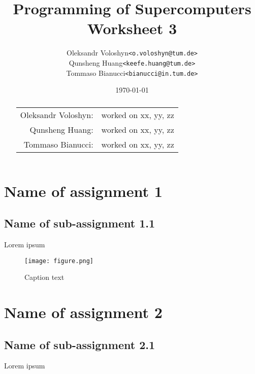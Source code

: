 \documentclass{article}
\title{Programming of Supercomputers\\Worksheet 3}
\author{
	\begin{tabular}{rl}
		Oleksandr Voloshyn& \texttt{<o.voloshyn@tum.de>}\\ 
		Qunsheng Huang& \texttt{<keefe.huang@tum.de>}\\ 
		Tommaso Bianucci& \texttt{<bianucci@in.tum.de>}
	\end{tabular}
}
\date{\today}
\begin{document}
\maketitle
\renewcommand{\abstractname}{Group members's contributions}
\begin{abstract}
	\begin{center}
		\begin{tabular}{rl}
		Oleksandr Voloshyn:& worked on xx, yy, zz\\
		Qunsheng Huang:& worked on xx, yy, zz\\
		Tommaso Bianucci:& worked on xx, yy, zz
		\end{tabular}
	\end{center}
\end{abstract}

\section{Name of assignment 1}
\subsection{Name of sub-assignment 1.1}
Lorem ipsum

\begin{figure}[p] %
 	\begin{center}
 		\texttt{[image: figure.png]} %
 		\caption{Caption text}
 		\label{fig:figureLabelName}
 	\end{center}
\end{figure}

\section{Name of assignment 2}
\subsection{Name of sub-assignment 2.1}
Lorem ipsum
\end{document}
